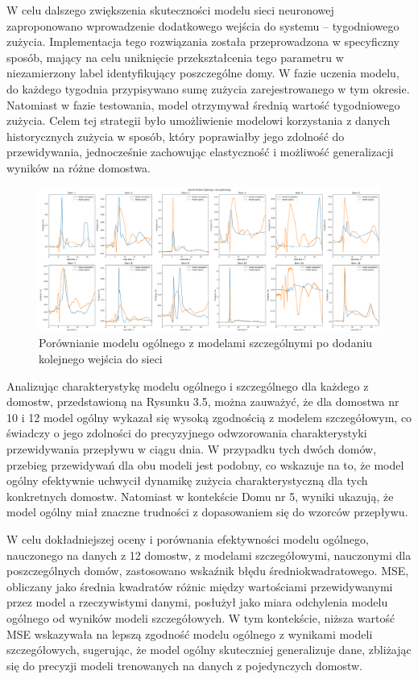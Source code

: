 \documentclass[a4paper,twoside,12pt]{book}
\begin{document}
W celu dalszego zwiększenia skuteczności modelu sieci neuronowej zaproponowano wprowadzenie dodatkowego wejścia do systemu – tygodniowego zużycia. Implementacja tego rozwiązania została przeprowadzona w specyficzny sposób, mający na celu uniknięcie przekształcenia tego parametru w niezamierzony label identyfikujący poszczególne domy. W fazie uczenia modelu, do każdego tygodnia przypisywano sumę zużycia zarejestrowanego w tym okresie. Natomiast w fazie testowania, model otrzymywał średnią wartość tygodniowego zużycia. Celem tej strategii było umożliwienie modelowi korzystania z danych historycznych zużycia w sposób, który poprawiałby jego zdolność do przewidywania, jednocześnie zachowując elastyczność i możliwość generalizacji wyników na różne domostwa.

\newpage

\begin{figure}[!h]
	\centering
	\includegraphics[width=1\textwidth]{img/szczegółowy_ogolny_porówniaie_dodatkowy.png}
	\caption{Porównianie modelu ogólnego z modelami szczególnymi po dodaniu kolejnego wejścia do sieci}
	\label{fig:etykieta-rysunku}
\end{figure}

Analizując charakterystykę modelu ogólnego i szczególnego dla każdego z domostw, przedstawioną na Rysunku 3.5, można zauważyć, że dla domostwa nr 10 i 12 model ogólny wykazał się wysoką zgodnością z modelem szczegółowym, co świadczy o jego zdolności do precyzyjnego odwzorowania charakterystyki przewidywania przepływu w ciągu dnia. W przypadku tych dwóch domów, przebieg przewidywań dla obu modeli jest podobny, co wskazuje na to, że model ogólny efektywnie uchwycił dynamikę zużycia charakterystyczną dla tych konkretnych domostw. Natomiast w kontekście Domu nr 5, wyniki ukazują, że model ogólny miał znaczne trudności z dopasowaniem się do wzorców przepływu.

W celu dokładniejszej oceny i porównania efektywności modelu ogólnego, nauczonego na danych z 12 domostw, z modelami szczegółowymi, nauczonymi dla poszczególnych domów, zastosowano wskaźnik błędu średniokwadratowego. MSE, obliczany jako średnia kwadratów różnic między wartościami przewidywanymi przez model a rzeczywistymi danymi, posłużył jako miara odchylenia modelu ogólnego od wyników modeli szczegółowych. W tym kontekście, niższa wartość MSE wskazywała na lepszą zgodność modelu ogólnego z wynikami modeli szczegółowych, sugerując, że model ogólny skuteczniej generalizuje dane, zbliżając się do precyzji modeli trenowanych na danych z pojedynczych domostw.
\end{document}
